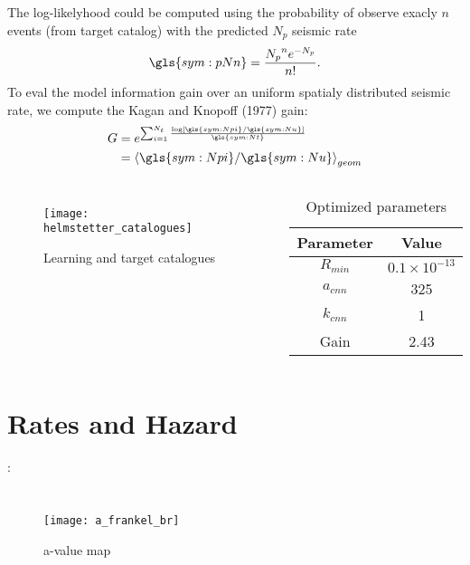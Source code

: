 \documentclass[final]{beamer}
\begin{document}
\begin{poster}
\footnotesize
The log-likelyhood could be computed using the probability of observe exacly $n$
events (from target catalog) with the predicted $N_p$ seismic rate
\small
		\begin{equation}
			\ensuremath{
				\gls{sym:pNn} = \frac{{N_p}^n e^{-N_p}}{n!}.
			}
			\label{eq:loglik}
		\end{equation}
\footnotesize
To eval the model information gain over an uniform spatialy distributed seismic
rate, we compute the Kagan and Knopoff (1977) gain:
\small
		\begin{equation}
			\ensuremath{
			\begin{align}
				G & = e^{\sum_{i = 1}^{N_t}
							\frac{\log \left[  \gls{sym:Npi} / \gls{sym:Nu}  \right]}
								 {\gls{sym:Nt}}
					  } \\
				  & = {\langle  \gls{sym:Npi} / \gls{sym:Nu}  \rangle}_{geom}
			\end{align}}
			\label{eq:G}
		\end{equation}	

\vspace{0.3cm}


\begin{columns}[c,totalwidth=\textwidth]
	\begin{figure}[H]
	  \centering
	  \texttt{[image: helmstetter\_catalogues]} 
	  \caption{Learning and target catalogues}
	  \label{fig:h_catalogue} 
	\end{figure}
	\begin{table}[H]
		\centering
		\begin{tabular}{c|c}
			Parameter & Value \\ \hline
			$R_{min}$ & $0.1\times10^{-13}$ \\
			$a_{cnn}$ & 325 \\
			$k_{cnn}$ & 1 \\ \hline
			Gain	  & 2.43
		\end{tabular}
		\caption{Optimized parameters}
		\label{tab:hemlstetter}
	\end{table}
\end{columns}


\vspace{0.3cm}
\section{Rates and Hazard}
\footnotesize \textbf{\citet{frankel_1995}}:
\begin{columns}[t,totalwidth=\textwidth]
		\begin{figure}[H]
		  \centering
		  \texttt{[image: a\_frankel\_br]} 
		  \caption{a-value map}
		  \label{fig:a_fran_br} 
		\end{figure}
	

\end{columns}
\end{poster}
\end{document}
